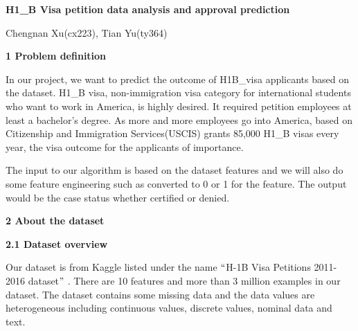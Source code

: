 \documentclass[12pt]{article}
\begin{document}
\begin{Center}
{\fontsize{16pt}{19.2pt}\selectfont \textbf{H1\_B Visa petition data analysis and approval prediction}\par}
\end{Center}\par

\begin{Center}
Chengnan Xu(cx223), Tian Yu(ty364)
\end{Center}\par


\vspace{\baselineskip}
\begin{FlushLeft}
{\fontsize{14pt}{16.8pt}\selectfont \textbf{1 Problem definition}\par}
\end{FlushLeft}\par

\begin{justify}
In our project, we want to predict the outcome of H1B\_visa applicants based on the dataset. H1\_B visa, non-immigration visa category for international students who want to work in America, is highly desired. It required petition employees at least a bachelor’s degree. As more and more employees go into America, based on Citizenship and Immigration Services(USCIS) grants 85,000 H1\_B visas every year, the visa outcome for the applicants of importance. 
\end{justify}\par

\begin{justify}
The input to our algorithm is based on the dataset features and we will also do some feature engineering such as converted to 0 or 1 for the feature. The output would be the case status whether certified or denied.
\end{justify}\par

{\fontsize{14pt}{16.8pt}\selectfont \textbf{2 About the dataset}\par}\par

\textbf{2.1 Dataset overview}\par

\begin{justify}
Our dataset is from Kaggle listed under the name $``$H-1B Visa Petitions 2011-2016 dataset$"$ . There are 10 features and more than 3 million examples in our dataset. The dataset contains some missing data and the data values are heterogeneous including continuous values, discrete values, nominal data and text. 
\end{justify}\par
\end{document}
